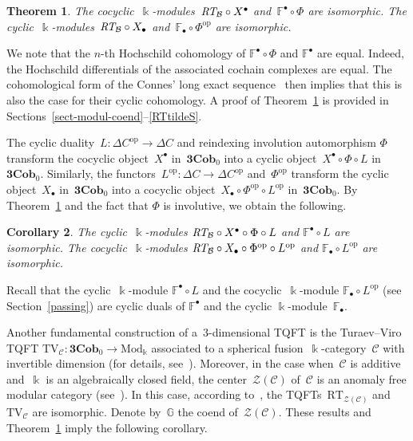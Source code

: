 \documentclass[10pt,a4paper]{amsart}
\numberwithin{equation}{section}
\newtheorem{Theorem}{Theorem}[section]
\newtheorem{Corollary}[Theorem]{Corollary}
\newcommand{\co}{\colon}
\newcommand{\Zen}[1]{\mc {Z}(#1)}
\newcommand{\mc}{\mathcal}
\newcommand{\opp}{\mathrm{op}}
\newcommand{\Mod}{\mathrm{Mod}}
\newcommand{\Cob}{\textbf{Cob}}
\newcommand{\kk}{\Bbbk}
\newcommand{\RT}{\text{RT}}
\newcommand{\TV}{\text{TV}}
\newcommand{\coend}{\mathbb{F}}
\newcommand{\coendzc}{\mathbb{G}}
\begin{document}
\begin{Theorem}\label{CYCINCOBRT}
	The cocyclic~$\kk$-modules~$\emph{\RT}_{\mc B}\circ X^\bullet$ and~$\coend^\bullet \circ \Phi$ are isomorphic.
	The cyclic~$\kk$-modules~$\emph{\RT}_{\mc B}\circ X_\bullet$ and~$\coend_\bullet \circ \Phi^\opp$ are isomorphic.
\end{Theorem}

We note that the $n$-th Hochschild cohomology of $\coend^\bullet \circ \Phi$ and $\coend^\bullet$ are equal. Indeed, the Hochschild differentials of the associated cochain complexes are equal. The cohomolo\-gical form of the Connes' long exact sequence~\cite[Proposition~9.6.11]{weibel} then implies that this is also the case for their cyclic cohomology.
A proof of Theorem~\ref{CYCINCOBRT} is provided in Sections~\ref{sect-modul-coend}--\ref{RTtildeS}.

The cyclic duality~$L\co \Delta C^{\opp}\to \Delta C$ and reindexing involution automorphism $\Phi$ transform the cocyclic object~$X^\bullet$ in~$\textbf{3}\Cob_0$ into a cyclic object~$X^\bullet \circ \Phi \circ L$ in~$\textbf{3}\Cob_0$.
Similarly, the functors~$L^\opp \co \Delta C\to \Delta C^{\opp}$ and~$\Phi^\opp$ transform the cyclic object~$X_\bullet$ in~$\textbf{3}\Cob_0$ into a cocyclic object~$X_\bullet \circ \Phi^{\opp} \circ L^\opp$ in~$\textbf{3}\Cob_0$.
By Theorem~\ref{CYCINCOBRT} and the fact that $\Phi$ is involutive, we obtain the following.

\begin{Corollary}\label{cycincobmajidsolotar}
The cyclic~$\kk$-modules $\emph{\RT}_{\mc B}\circ X^\bullet \circ \Phi \circ L$ and $\coend^\bullet \circ L$ are isomorphic.
The cocyclic~$\kk$-modules $\emph{\RT}_{\mc B}\circ X_\bullet \circ \Phi^{\opp} \circ L^\opp$ and $\coend_\bullet \circ L^\opp$ are isomorphic.
\end{Corollary}

Recall that the cyclic~$\kk$-module $\coend^\bullet \circ L$ and the cocyclic~$\kk$-module $\coend_\bullet \circ L^\opp$ (see Section~\ref{passing}) are cyclic duals of $\coend^\bullet$ and the cyclic $\kk$-module~$\coend_\bullet$.

Another fundamental construction of a~$3$-dimensional TQFT is the Turaev--Viro TQFT $\TV_{\mc C} \co \textbf{3}\Cob_0\to \Mod_\kk$ associated to a spherical fusion~$\kk$-category~$\mc C$ with invertible dimension (for details, see~\cite{moncatstft}). Moreover, in the case when~$\mc C$ is additive and~$\kk$ is an algebraically closed field, the center~$\Zen{\mc C}$ of~$\mc C$ is an anomaly free modular category (see~\cite[Theorems~5.3 and~5.4]{moncatstft}).
In this case, according to~\cite[Theorem~17.1]{moncatstft}, the TQFTs~$\RT_{\Zen{\mc C}}$ and~$\TV_{\mc C}$ are isomorphic.
Denote by~$\coendzc$ the coend of~$\Zen{\mc C}$.
These results and Theorem~\ref{CYCINCOBRT} imply the following corollary.
\end{document}
